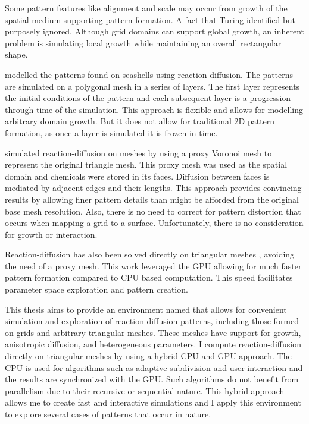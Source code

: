 Some pattern features like alignment and scale may occur from growth of the spatial medium supporting pattern formation. A fact that Turing identified but purposely ignored. Although grid domains can support global growth, an inherent problem is simulating local growth while maintaining an overall rectangular shape. 

\citet{fowler1992modeling} modelled the patterns found on seashells using reaction-diffusion. The patterns are simulated on a polygonal mesh in a series of layers. The first layer represents the initial conditions of the pattern and each subsequent layer is a progression through time of the simulation. This approach is flexible and allows for modelling arbitrary domain growth. But it does not allow for traditional 2D pattern formation, as once a layer is simulated it is frozen in time.

\citet{Turk1991} simulated reaction-diffusion on meshes by using a proxy Voronoi mesh to represent the original triangle mesh. This proxy mesh was used as the spatial domain and chemicals were stored in its faces. Diffusion between faces is mediated by adjacent edges and their lengths. This approach provides convincing results by allowing finer pattern details than might be afforded from the original base mesh resolution. Also, there is no need to correct for pattern distortion that occurs when mapping a grid to a surface. Unfortunately, there is no consideration for growth or interaction. 

Reaction-diffusion has also been solved directly on triangular meshes \citep{Descombes2016}, avoiding the need of a proxy mesh. This work leveraged the GPU allowing for much faster pattern formation compared to CPU based computation. This speed facilitates parameter space exploration and pattern creation. 

This thesis aims to provide an environment named \ProgramName{} that allows for convenient simulation and exploration of reaction-diffusion patterns, including those formed on grids and arbitrary triangular meshes. These meshes have support for growth, anisotropic diffusion, and heterogeneous parameters. I compute reaction-diffusion directly on triangular meshes by using a hybrid CPU and GPU approach. The CPU is used for algorithms such as adaptive subdivision and user interaction and the results are synchronized with the GPU. Such algorithms do not benefit from parallelism due to their recursive or sequential nature. This hybrid approach allows me to create fast and interactive simulations and I apply this environment to explore several cases of patterns that occur in nature.

